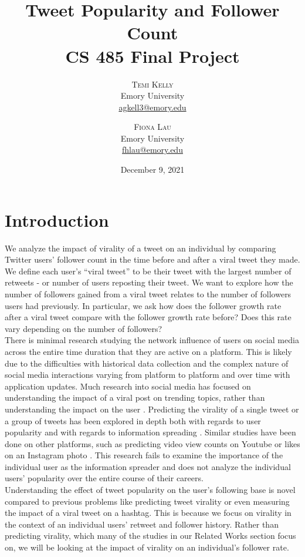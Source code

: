 \documentclass[twoside,twocolumn]{article}
\title{Tweet Popularity and Follower Count \\ CS 485 Final Project} %
\author{%
  \textsc{Temi Kelly} \\[1ex] %
  \normalsize Emory University \\ %
  \normalsize \href{mailto:agkell3@emory.edu}{agkell3@emory.edu} %
  \and %
  \textsc{Fiona Lau} \\[1ex] %
  \normalsize Emory University \\ %
  \normalsize \href{mailto:fhlau@emory.edu}{fhlau@emory.edu} %
  \and %
} %
\date{December 9, 2021} %
\begin{document}
\maketitle


\section{Introduction}
We analyze the impact of virality of a tweet on an individual by comparing Twitter users’ follower count in the time before and after a viral tweet they made. We define each user’s “viral tweet” to be their tweet with the largest number of retweets - or number of users reposting their tweet. We want to explore how the number of followers gained from a viral tweet relates to the number of followers users had previously. In particular, we ask how does the follower growth rate after a viral tweet compare with the follower growth rate before? Does this rate vary depending on the number of followers?\\

There is minimal research studying the network influence of users on social media across the entire time duration that they are active on a platform. This is likely due to the difficulties with historical data collection and the complex nature of social media interactions varying from platform to platform and over time with application updates. Much research into social media has focused on understanding the impact of a viral post on trending topics, rather than understanding the impact on the user \cite{9}\cite{10}\cite{11}. Predicting the virality of a single tweet or a group of tweets has been explored in depth both with regards to user popularity \cite{2} and with regards to information spreading \cite{3}. Similar studies have been done on other platforms, such as predicting video view counts on Youtube \cite{4} or likes on an Instagram photo \cite{5}. This research fails to examine the importance of the individual user as the information spreader and does not analyze the individual users’ popularity over the entire course of their careers.\\

Understanding the effect of tweet popularity on the user’s following base is novel compared to previous problems like predicting tweet virality or even measuring the impact of a viral tweet on a hashtag. This is because we focus on virality in the context of an individual users’ retweet and follower history. Rather than predicting virality, which many of the studies in our Related Works section focus on, we will be looking at the impact of virality on an individual’s follower rate.\\
\end{document}
